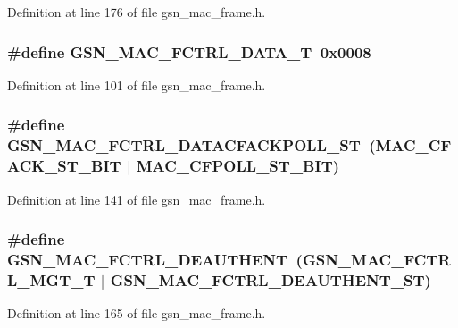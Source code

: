 Definition at line 176 of file gsn\_\-mac\_\-frame.h.

\hypertarget{a00523_a922216036b4ed4b443f56027eecd428b}{
\subsubsection[{GSN\_\-MAC\_\-FCTRL\_\-DATA\_\-T}]{\setlength{\rightskip}{0pt plus 5cm}\#define GSN\_\-MAC\_\-FCTRL\_\-DATA\_\-T~0x0008}}
\label{a00523_a922216036b4ed4b443f56027eecd428b}


Definition at line 101 of file gsn\_\-mac\_\-frame.h.

\hypertarget{a00523_a6b41426965f1ca3d3537cb0f391e1aac}{
\subsubsection[{GSN\_\-MAC\_\-FCTRL\_\-DATACFACKPOLL\_\-ST}]{\setlength{\rightskip}{0pt plus 5cm}\#define GSN\_\-MAC\_\-FCTRL\_\-DATACFACKPOLL\_\-ST~(MAC\_\-CFACK\_\-ST\_\-BIT $|$ MAC\_\-CFPOLL\_\-ST\_\-BIT)}}
\label{a00523_a6b41426965f1ca3d3537cb0f391e1aac}


Definition at line 141 of file gsn\_\-mac\_\-frame.h.

\hypertarget{a00523_a4afc6b18a2a73d74e849c37d86c5d93a}{
\subsubsection[{GSN\_\-MAC\_\-FCTRL\_\-DEAUTHENT}]{\setlength{\rightskip}{0pt plus 5cm}\#define GSN\_\-MAC\_\-FCTRL\_\-DEAUTHENT~(GSN\_\-MAC\_\-FCTRL\_\-MGT\_\-T     $|$ GSN\_\-MAC\_\-FCTRL\_\-DEAUTHENT\_\-ST)}}
\label{a00523_a4afc6b18a2a73d74e849c37d86c5d93a}


Definition at line 165 of file gsn\_\-mac\_\-frame.h.

